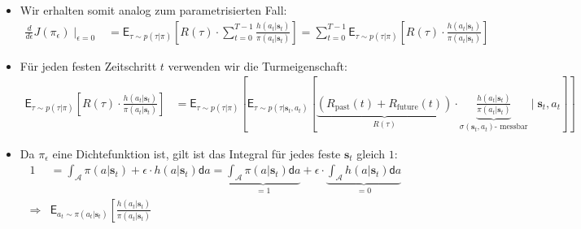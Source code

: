 \documentclass[a4paper, 12pt]{scrartcl}
\begin{document}
\begin{beweis}
\begin{itemize}
        \item Wir erhalten somit analog zum parametrisierten Fall:
        \begin{align*}
            \frac{d}{d \epsilon} J(\pi_\epsilon) \mid_{\epsilon=0}
            &=
            \mathsf{E}_{\tau \sim p(\tau|\pi)}
            \left[
                R(\tau) \cdot 
                \sum_{t=0}^{T-1} 
                \frac{h(a_t|\bm{s}_t)}{\pi(a_t|\bm{s}_t)} 
            \right]
            =
            \sum_{t=0}^{T-1}
            \mathsf{E}_{\tau \sim p(\tau|\pi)}
            \left[
                R(\tau) \cdot 
                \frac{h(a_t|\bm{s}_t)}{\pi(a_t|\bm{s}_t)} 
            \right]
        \end{align*}
        \item Für jeden festen Zeitschritt $t$ verwenden wir die Turmeigenschaft:
        \begin{align*}
            \mathsf{E}_{\tau \sim p(\tau|\pi)}
            \left[
                R(\tau) \cdot 
                \frac{h(a_t|\bm{s}_t)}{\pi(a_t|\bm{s}_t)} 
            \right]
            &=
            \mathsf{E}_{\tau \sim p(\tau|\pi)}
            \left[
                \mathsf{E}_{\tau \sim p(\tau|\bm{s}_t,a_t)}
                \left[
                    \underbrace{
                        \left( R_{\text{past}}(t) + R_{\text{future}}(t) \right)
                    }_{
                         R(\tau)
                    } \cdot 
                    \underbrace{
                        \frac{h(a_t|\bm{s}_t)}{\pi(a_t|\bm{s}_t)}
                    }_{
                        \sigma(\bm{s}_t,a_t)\text{- messbar}
                    }
                    \mid \bm{s}_t,a_t
                \right]
            \right]
        \end{align*}
        \item Da $\pi_\epsilon$ eine Dichtefunktion ist, 
        gilt ist das Integral für jedes feste $\bm{s}_t$ gleich $1$:
        \begin{align*}
            1 
            &= \int_{\mathcal{A}} \pi(a|\bm{s}_t) + \epsilon \cdot h(a|\bm{s}_t) \mathsf{d}a
            = 
            \underbrace{
                \int_{\mathcal{A}} \pi(a|\bm{s}_t) \mathsf{d}a
            }_{=1}
            + \epsilon \cdot
            \underbrace{\int_{\mathcal{A}} h(a|\bm{s}_t) \mathsf{d}a}_{=0}
            \\
            \Rightarrow &
            \mathsf{E}_{a_t \sim \pi(a_t|\bm{s}_t)}
            \left[
                \frac{h(a_t|\bm{s}_t)}{\pi(a_t|\bm{s}_t)} 

\end{align*}
\end{itemize}
\end{beweis}
\end{document}
